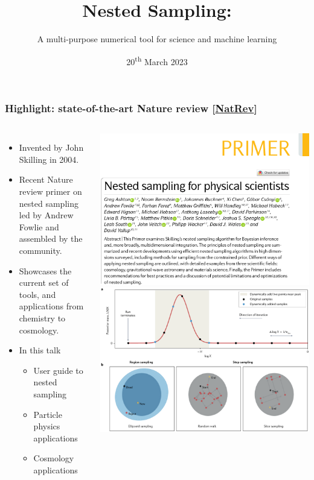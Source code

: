 \documentclass[aspectratio=169]{beamer}
\title{Nested Sampling:}
\subtitle{A multi-purpose numerical tool for science and machine learning  }
\date{20\textsuperscript{th} March 2023}
\begin{document}
\begin{frame}
    \titlepage
\end{frame}

\begin{frame}
    \frametitle{Highlight: state-of-the-art Nature review [\href{https://www.nature.com/articles/s43586-022-00121-x}{NatRev}]}
    \begin{columns}
        \begin{itemize}
            \item Invented by John Skilling in 2004.
            \item Recent Nature review primer on nested sampling led by Andrew Fowlie and assembled by the community.
            \item Showcases the current set of tools, and applications from chemistry to cosmology.
            \item In this talk
                \begin{itemize}
                    \item User guide to nested sampling
                    \item Particle physics applications
                    \item Cosmology applications
                \end{itemize}
        \end{itemize}
        \includegraphics[width=\textwidth]{figures/nature1}
        \includegraphics[width=\textwidth]{figures/nature2}

\end{columns}
\end{frame}
\end{document}
